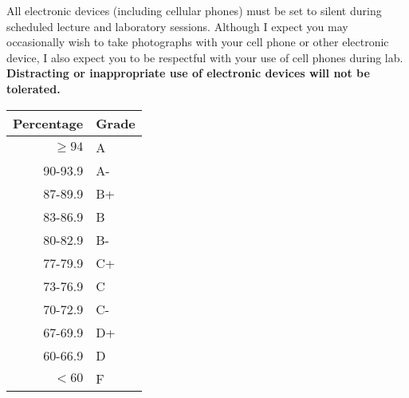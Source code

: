 \documentclass{tufte-handout}
\begin{document}
All electronic devices (including cellular phones) must be set to silent during scheduled lecture and laboratory sessions. Although I expect you may occasionally wish to take photographs with your cell phone or other electronic device, I also expect you to be respectful with your use of cell phones during lab. \textbf{Distracting or inappropriate use of electronic devices will not be tolerated.}


\begin{margintable}
\begin{tabular}{rl}
Percentage & Grade \\
\hline 
$\ge94$ & A \\
90-93.9 & A- \\
87-89.9 & B+ \\
83-86.9 & B \\
80-82.9 & B- \\
77-79.9 & C+ \\
73-76.9 & C \\
70-72.9 & C- \\
67-69.9 & D+ \\
60-66.9 & D \\
$<60$ & F \\
\hline
\end{tabular}
\end{margintable}
\end{document}
